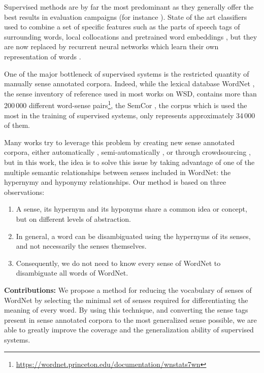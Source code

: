 \documentclass[11pt,a4paper]{article}
\newcommand{\tbf}[1]{\textbf{#1}}
\begin{document}
Supervised methods are by far the most predominant as they generally offer the best results in evaluation campaigns (for instance \citep{Navigli2007}). State of the art classifiers used to combine a set of specific features such as the parts of speech tags of surrounding words, local collocations \citep{Zhong2010} and pretrained word embeddings \citep{iacobacci2016embeddings}, but they are now replaced by recurrent neural networks which learn their own representation of words \citep{raganato2017,minh2018}.

One of the major bottleneck of supervised systems is the restricted quantity of manually sense annotated corpora. Indeed, while the lexical database WordNet \citep{miller1995wordnet}, the sense inventory of reference used in most works on WSD, contains more than 200\,000 different word-sense pairs\footnote{\url{https://wordnet.princeton.edu/documentation/wnstats7wn}}, the SemCor \citep{Miller1993}, the corpus which is used the most in the training of supervised systems, only represents approximately 34\,000 of them. 



Many works try to leverage this problem by creating new sense annotated corpora, either automatically \citep{pasini2017}, semi-automatically \citep{taghipourng2015}, or through crowdsourcing \citep{yuan_2016}, but in this work, the idea is to solve this issue by taking advantage of one of the multiple semantic relationships between senses included in WordNet: the hypernymy and hyponymy relationships. Our method is based on three observations:
\begin{enumerate}
    \item A sense, its hypernym and its hyponyms share a common idea or concept, but on different levels of abstraction.
    \item In general, a word can be disambiguated using the hypernyms of its senses, and not necessarily the senses themselves. 
    \item Consequently, we do not need to know every sense of WordNet to disambiguate all words of WordNet. 
\end{enumerate} 
\tbf{Contributions:}
We propose a method for reducing the vocabulary of senses of WordNet by selecting the minimal set of senses required for differentiating the meaning of every word. 
By using this technique, and converting the sense tags present in sense annotated corpora to the most generalized sense possible, we are able to greatly improve the coverage and the generalization ability of supervised systems.
\end{document}
